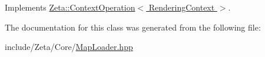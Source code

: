 Implements \hyperlink{classZeta_1_1ContextOperation_a3e7286287026324335d352933fb62a78}{Zeta\+::\+Context\+Operation$<$ Rendering\+Context $>$}.



The documentation for this class was generated from the following file\+:\begin{DoxyCompactItemize}
\item 
include/\+Zeta/\+Core/\hyperlink{MapLoader_8hpp}{Map\+Loader.\+hpp}\end{DoxyCompactItemize}

